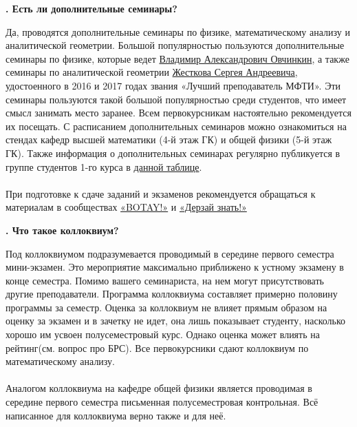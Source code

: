\documentclass[14pt]{extarticle}
\newcounter{question}
\newcommand\Que[1]{%
    \begin{minipage}{\textwidth}
    \leavevmode\par
    \stepcounter{question}
    \noindent
    {\large\textbf{\thequestion. #1}}\par}
\newcommand\Ans[2][]{%
    \leavevmode\par\noindent
    {\leftskip37pt
    \textbf{#1}#2\par}
    \end{minipage}}
\begin{document}
\Que{Есть ли дополнительные семинары?}
\Ans{Да, проводятся дополнительные семинары по физике, математическому анализу и аналитической геометрии. Большой популярностью пользуются дополнительные семинары по физике, которые ведет \href{http://wikimipt.org/wiki/\%D0\%9E\%D0\%B2\%D1\%87\%D0\%B8\%D0\%BD\%D0\%BA\%D0\%B8\%D0\%BD_\%D0\%92\%D0\%BB\%D0\%B0\%D0\%B4\%D0\%B8\%D0\%BC\%D0\%B8\%D1\%80_\%D0\%90\%D0\%BB\%D0\%B5\%D0\%BA\%D1\%81\%D0\%B0\%D0\%BD\%D0\%B4\%D1\%80\%D0\%BE\%D0\%B2\%D0\%B8\%D1\%87}{Владимир Александрович Овчинкин}, а также семинары по аналитической геометрии \href{http://wikimipt.org/wiki/\%D0\%96\%D0\%B5\%D1\%81\%D1\%82\%D0\%BA\%D0\%BE\%D0\%B2_\%D0\%A1\%D0\%B5\%D1\%80\%D0\%B3\%D0\%B5\%D0\%B9_\%D0\%90\%D0\%BD\%D0\%B4\%D1\%80\%D0\%B5\%D0\%B5\%D0\%B2\%D0\%B8\%D1\%87}{Жесткова Сергея Андреевича}, удостоенного в 2016 и 2017 годах звания «Лучший преподаватель МФТИ». Эти семинары пользуются такой большой популярностью среди студентов, что имеет смысл занимать место заранее. Всем первокурсникам настоятельно рекомендуется их посещать. С расписанием дополнительных семинаров можно ознакомиться на стендах кафедр высшей математики (4-й этаж ГК) и общей физики (5-й этаж ГК). Также информация о дополнительных семинарах регулярно публикуется в группе студентов 1-го курса в \href{https://docs.google.com/spreadsheets/d/1M6Rw4YA6vlkbj5zYJtBc4Z5bTZ47kVKb2b7ZFDoi3X8/edit#gid=0}{данной таблице}. \\ \\ При подготовке к сдаче заданий и экзаменов рекомендуется обращаться к материалам в сообществах \href{https://mipt.ru/botay_phystech}{«BOTAY!»} и \href{https://vk.com/dare_to_know}{«Дерзай знать!»}}

\Que{Что такое коллоквиум?}
\Ans{Под коллоквиумом подразумевается проводимый в середине первого семестра мини-экзамен. Это мероприятие максимально приближено к устному экзамену в конце семестра. Помимо вашего семинариста, на нем могут присутствовать другие преподаватели. Программа коллоквиума составляет примерно половину программы за семестр. Оценка за коллоквиум не влияет прямым образом на оценку за экзамен и в зачетку не идет, она лишь показывает студенту, насколько хорошо им усвоен полусеместровый курс. Однако оценка может влиять на рейтинг(см. вопрос про БРС). Все первокурсники сдают коллоквиум по математическому анализу. \\ \\ Аналогом коллоквиума на кафедре общей физики является проводимая в середине первого семестра письменная полусеместровая контрольная. Всё написанное для коллоквиума верно также и для неё.}
\end{document}
